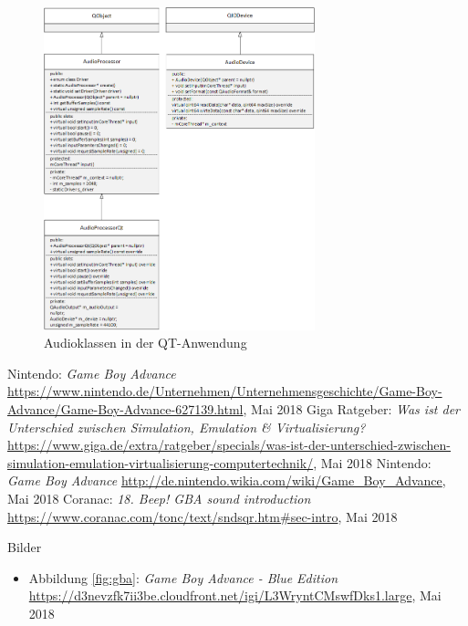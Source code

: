 \documentclass[11pt,a4paper]{scrartcl}
\begin{document}
\begin{figure}[h]
    \centering
    \includegraphics[width=0.7\textwidth]{QT_Klassendiagramm}
    \caption{Audioklassen in der QT-Anwendung}
    \label{fig:qtclassdiagramm}
\end{figure}



\begin{thebibliography}{tiefe}
    Nintendo: \textit{Game Boy Advance}\newline
    \url{https://www.nintendo.de/Unternehmen/Unternehmensgeschichte/Game-Boy-Advance/Game-Boy-Advance-627139.html}, Mai 2018
    Giga Ratgeber: \textit{Was ist der Unterschied zwischen Simulation, Emulation \& Virtualisierung?}\newline
    \url{https://www.giga.de/extra/ratgeber/specials/was-ist-der-unterschied-zwischen-simulation-emulation-virtualisierung-computertechnik/}, Mai 2018
    Nintendo: \textit{Game Boy Advance}\newline
    \url{http://de.nintendo.wikia.com/wiki/Game_Boy_Advance}, Mai 2018
    Coranac: \textit{18. Beep! GBA sound introduction}\newline
    \url{https://www.coranac.com/tonc/text/sndsqr.htm#sec-intro}, Mai 2018
\end{thebibliography}

\vspace{1cm}

\huge Bilder
\normalsize

\begin{itemize}
    \item Abbildung \ref{fig:gba}: \textit{Game Boy Advance - Blue Edition}\newline
    \url{https://d3nevzfk7ii3be.cloudfront.net/igi/L3WryntCMswfDks1.large}, Mai 2018
\end{itemize}
\end{document}
